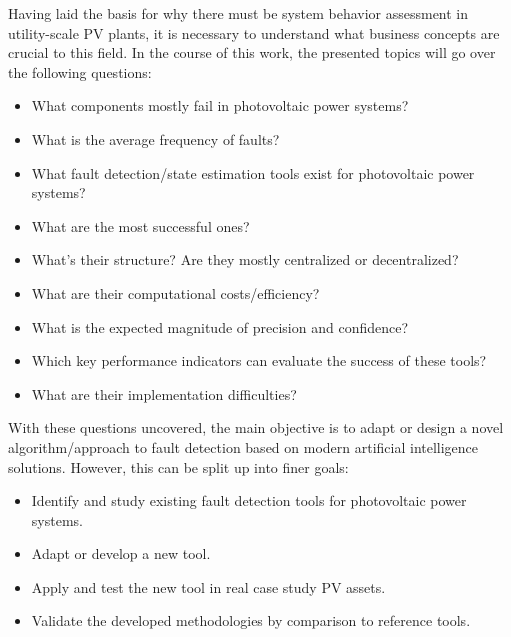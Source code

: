 Having laid the basis for why there must be system behavior assessment in utility-scale PV plants, it is necessary to understand what business concepts are crucial to this field. In the course of this work, the presented topics will go over the following questions:

\begin{itemize}
    \item What components mostly fail in photovoltaic power systems?
    \item What is the average frequency of faults?
    \item What fault detection/state estimation tools exist for photovoltaic
    power systems?
    \item What are the most successful ones?
    \item What's their structure? Are they mostly centralized or decentralized?
    \item What are their computational costs/efficiency?
    \item What is the expected magnitude of precision and confidence?
    \item Which key performance indicators can evaluate the success of these
    tools? 
    \item What are their implementation difficulties?
\end{itemize}

With these questions uncovered, the main objective is to adapt or design a novel algorithm/approach to fault detection based on modern artificial intelligence solutions. However, this can be split up into finer goals:

\begin{itemize}
    \item  Identify and study existing fault detection tools for photovoltaic
    power systems.
    \item  Adapt or develop a new tool.
    \item Apply and test the new tool in real case study PV assets.
    \item Validate the developed methodologies by comparison to reference tools.
\end{itemize}


